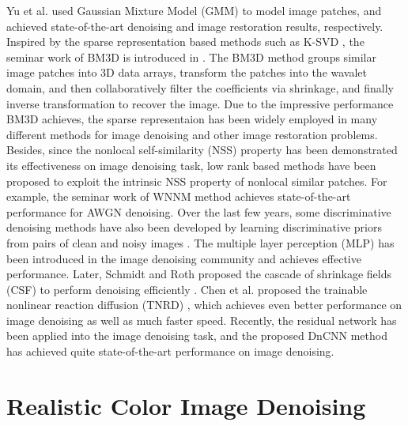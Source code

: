 Yu et al.  \cite{ple} used Gaussian Mixture Model (GMM) to model image patches, and achieved state-of-the-art denoising and image restoration results, respectively. Inspired by the sparse representation based methods such as K-SVD \cite{ksvd}, the seminar work of BM3D is introduced in \cite{bm3d}. The BM3D method groups similar image patches into 3D data arrays, transform the  patches into the wavalet domain, and then collaboratively filter the coefficients via shrinkage, and finally inverse transformation to recover the image. Due to the impressive performance BM3D achieves, the sparse representaion has been widely employed in many different methods \cite{lssc,ncsr} for image denoising and other image restoration problems. Besides, since the nonlocal self-similarity (NSS) property has been demonstrated its effectiveness on image denoising task, low rank based methods \cite{nnm,wnnm} have been proposed to exploit the intrinsic NSS property of nonlocal similar patches. For example, the seminar work of WNNM \cite{wnnm} method achieves state-of-the-art performance for AWGN denoising. Over the last few years, some discriminative denoising methods have also been developed by learning discriminative priors from pairs of clean and noisy images \cite{mlp,csf,tnrd, dncnn}. The multiple layer perception (MLP) \cite{mlp} has been introduced in the image denoising community and achieves effective performance. Later, Schmidt and Roth proposed the cascade of shrinkage fields (CSF) to perform denoising efficiently \cite{csf}. Chen et al. proposed the trainable nonlinear reaction diffusion (TNRD) \cite{tnrd}, which achieves even better performance on image denoising as well as much faster speed. Recently, the residual network \cite{residualnetwork} has been applied into the image denoising task, and the proposed DnCNN method \cite{dncnn} has achieved quite state-of-the-art performance on image denoising.


\section{Realistic Color Image Denoising}
\label{sec:review:feature}

